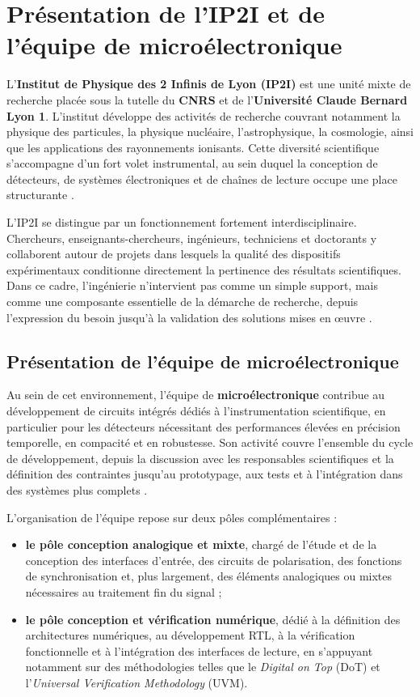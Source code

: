 
\chapter{Présentation de l’IP2I et de l’équipe de microélectronique}
\label{chap:ip2i-equipe}
\justifying
\sloppy

L’\textbf{Institut de Physique des 2 Infinis de Lyon (IP2I)} est une unité mixte de recherche placée sous la tutelle du \textbf{CNRS} et de l’\textbf{Université Claude Bernard Lyon 1}. L’institut développe des activités de recherche couvrant notamment la physique des particules, la physique nucléaire, l’astrophysique, la cosmologie, ainsi que les applications des rayonnements ionisants. Cette diversité scientifique s’accompagne d’un fort volet instrumental, au sein duquel la conception de détecteurs, de systèmes électroniques et de chaînes de lecture occupe une place structurante \cite{ip2iinstitut}.

L’IP2I se distingue par un fonctionnement fortement interdisciplinaire. Chercheurs, enseignants-chercheurs, ingénieurs, techniciens et doctorants y collaborent autour de projets dans lesquels la qualité des dispositifs expérimentaux conditionne directement la pertinence des résultats scientifiques. Dans ce cadre, l’ingénierie n’intervient pas comme un simple support, mais comme une composante essentielle de la démarche de recherche, depuis l’expression du besoin jusqu’à la validation des solutions mises en œuvre \cite{ip2iinstitut}.

\section{Présentation de l’équipe de microélectronique}

Au sein de cet environnement, l’équipe de \textbf{microélectronique} contribue au développement de circuits intégrés dédiés à l’instrumentation scientifique, en particulier pour les détecteurs nécessitant des performances élevées en précision temporelle, en compacité et en robustesse. Son activité couvre l’ensemble du cycle de développement, depuis la discussion avec les responsables scientifiques et la définition des contraintes jusqu’au prototypage, aux tests et à l’intégration dans des systèmes plus complets \cite{ip2imicroelectronique}.

L’organisation de l’équipe repose sur deux pôles complémentaires :
\begin{itemize}
    \item \textbf{le pôle conception analogique et mixte}, chargé de l’étude et de la conception des interfaces d'entrée, des circuits de polarisation, des fonctions de synchronisation et, plus largement, des éléments analogiques ou mixtes nécessaires au traitement fin du signal ;
    \item \textbf{le pôle conception et vérification numérique}, dédié à la définition des architectures numériques, au développement RTL, à la vérification fonctionnelle et à l’intégration des interfaces de lecture, en s’appuyant notamment sur des méthodologies telles que le \textit{Digital on Top} (DoT) et l’\textit{Universal Verification Methodology} (UVM).
\end{itemize}

